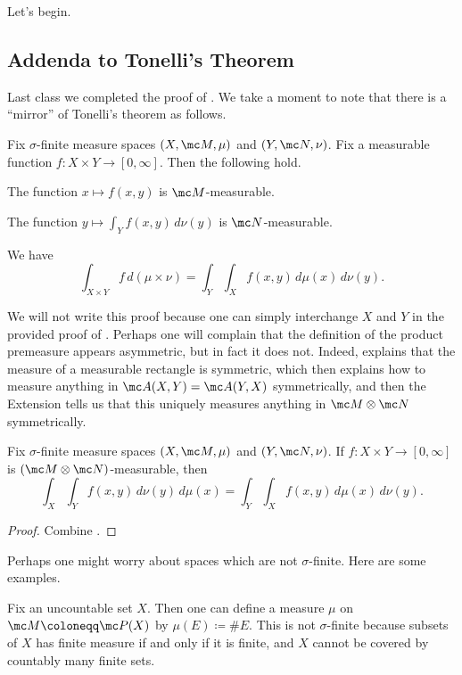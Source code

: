 \documentclass[../notes.tex]{subfiles}
\begin{document}
Let's begin.

\subsection{Addenda to Tonelli's Theorem}
Last class we completed the proof of . We take a moment to note that there is a ``mirror'' of Tonelli's theorem as follows.
\begin{theorem}[Tonelli] \label{thm:tonelli-2}
	Fix $\sigma$-finite measure spaces $(X,\mc M,\mu)$ and $(Y,\mc N,\nu)$. Fix a measurable function $f\colon X\times Y\to[0,\infty]$. Then the following hold.
	\begin{listalph}
		\item The function $x\mapsto f(x,y)$ is $\mc M$-measurable.
		\item The function $y\mapsto\int_Yf(x,y)\,d\nu(y)$ is $\mc N$-measurable.
		\item We have
		\[\int_{X\times Y}f\,d(\mu\times\nu)=\int_Y\int_Xf(x,y)\,d\mu(x)\,d\nu(y).\]
	\end{listalph}
\end{theorem}
We will not write this proof because one can simply interchange $X$ and $Y$ in the provided proof of . Perhaps one will complain that the definition of the product premeasure  appears asymmetric, but in fact it does not. Indeed,  explains that the measure of a measurable rectangle is symmetric, which then explains how to measure anything in $\mc A(X,Y)=\mc A(Y,X)$ symmetrically, and then the Extension  tells us that this uniquely measures anything in $\mc M\otimes\mc N$ symmetrically.
\begin{corollary}
	Fix $\sigma$-finite measure spaces $(X,\mc M,\mu)$ and $(Y,\mc N,\nu)$. If $f\colon X\times Y\to[0,\infty]$ is $(\mc M\otimes\mc N)$-measurable, then
	\[\int_X\int_Yf(x,y)\,d\nu(y)\,d\mu(x)=\int_Y\int_Xf(x,y)\,d\mu(x)\,d\nu(y).\]
\end{corollary}
\begin{proof}
	Combine .
\end{proof}
Perhaps one might worry about spaces which are not $\sigma$-finite. Here are some examples.
\begin{example}
	Fix an uncountable set $X$. Then one can define a measure $\mu$ on $\mc M\coloneqq\mc P(X)$ by $\mu(E)\coloneqq\#E$. This is not $\sigma$-finite because subsets of $X$ has finite measure if and only if it is finite, and $X$ cannot be covered by countably many finite sets.
\end{example}
\end{document}
